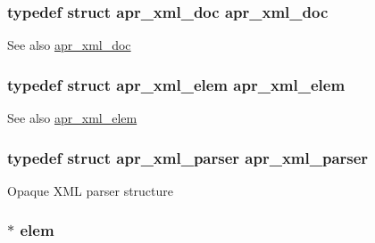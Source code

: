 \subsubsection[{\texorpdfstring{apr\+\_\+xml\+\_\+doc}{apr_xml_doc}}]{\setlength{\rightskip}{0pt plus 5cm}typedef struct {\bf apr\+\_\+xml\+\_\+doc} {\bf apr\+\_\+xml\+\_\+doc}}\hypertarget{group__APR__Util__XML_ga98eba70878b9460f2530e7a21bb6ae74}{}\label{group__APR__Util__XML_ga98eba70878b9460f2530e7a21bb6ae74}
\begin{DoxySeeAlso}{See also}
\hyperlink{structapr__xml__doc}{apr\+\_\+xml\+\_\+doc} 
\end{DoxySeeAlso}
\subsubsection[{\texorpdfstring{apr\+\_\+xml\+\_\+elem}{apr_xml_elem}}]{\setlength{\rightskip}{0pt plus 5cm}typedef struct {\bf apr\+\_\+xml\+\_\+elem} {\bf apr\+\_\+xml\+\_\+elem}}\hypertarget{group__APR__Util__XML_ga31390d11ec04137c925ddf43c2223270}{}\label{group__APR__Util__XML_ga31390d11ec04137c925ddf43c2223270}
\begin{DoxySeeAlso}{See also}
\hyperlink{structapr__xml__elem}{apr\+\_\+xml\+\_\+elem} 
\end{DoxySeeAlso}
\subsubsection[{\texorpdfstring{apr\+\_\+xml\+\_\+parser}{apr_xml_parser}}]{\setlength{\rightskip}{0pt plus 5cm}typedef struct {\bf apr\+\_\+xml\+\_\+parser} {\bf apr\+\_\+xml\+\_\+parser}}\hypertarget{group__APR__Util__XML_gab08a1c255615afda782318811a5053d9}{}\label{group__APR__Util__XML_gab08a1c255615afda782318811a5053d9}
Opaque X\+ML parser structure 
\subsubsection[{\texorpdfstring{elem}{elem}}]{ $\ast$ {\bf elem}}\hypertarget{group__APR__Util__XML_gaf6c0c31c62555e73fa50b02e1393afc2}{}\label{group__APR__Util__XML_gaf6c0c31c62555e73fa50b02e1393afc2}


